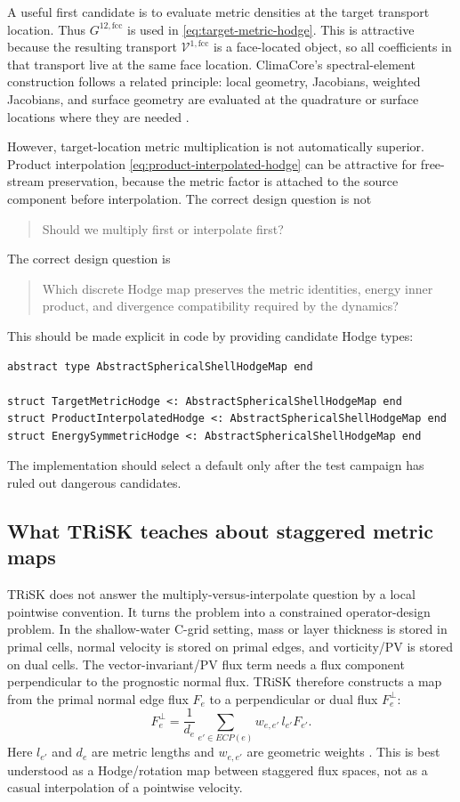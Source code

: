 \documentclass[11pt]{article}
\newcommand{\mc}[1]{\mathcal{#1}}
\newcommand{\Vflux}{\mc{V}}
\begin{document}
A useful first candidate is to evaluate metric densities at the target transport location.  Thus \(G^{12,\mathrm{fcc}}\) is used in \eqref{eq:target-metric-hodge}.  This is attractive because the resulting transport \(\Vflux^{1,\mathrm{fcc}}\) is a face-located object, so all coefficients in that transport live at the same face location.  ClimaCore's spectral-element construction follows a related principle: local geometry, Jacobians, weighted Jacobians, and surface geometry are evaluated at the quadrature or surface locations where they are needed \citep{ClimaCoreSpectralElement}.

However, target-location metric multiplication is not automatically superior.  Product interpolation \eqref{eq:product-interpolated-hodge} can be attractive for free-stream preservation, because the metric factor is attached to the source component before interpolation.  The correct design question is not
\begin{quote}
Should we multiply first or interpolate first?
\end{quote}
The correct design question is
\begin{quote}
Which discrete Hodge map preserves the metric identities, energy inner product, and divergence compatibility required by the dynamics?
\end{quote}

This should be made explicit in code by providing candidate Hodge types:
\begin{lstlisting}
abstract type AbstractSphericalShellHodgeMap end

struct TargetMetricHodge <: AbstractSphericalShellHodgeMap end
struct ProductInterpolatedHodge <: AbstractSphericalShellHodgeMap end
struct EnergySymmetricHodge <: AbstractSphericalShellHodgeMap end
\end{lstlisting}
The implementation should select a default only after the test campaign has ruled out dangerous candidates.

\subsection{What TRiSK teaches about staggered metric maps}
\label{subsec:trisk-lessons}

TRiSK does not answer the multiply-versus-interpolate question by a local pointwise convention.  It turns the problem into a constrained operator-design problem.  In the shallow-water C-grid setting, mass or layer thickness is stored in primal cells, normal velocity is stored on primal edges, and vorticity/PV is stored on dual cells.  The vector-invariant/PV flux term needs a flux component perpendicular to the prognostic normal flux.  TRiSK therefore constructs a map from the primal normal edge flux \(F_e\) to a perpendicular or dual flux \(F_e^\perp\):
\begin{equation}
  F_e^\perp
  =
  \frac{1}{d_e}
  \sum_{e'\in ECP(e)} w_{e,e'}\,l_{e'}F_{e'}.
  \label{eq:trisk-perp-flux}
\end{equation}
Here \(l_{e'}\) and \(d_e\) are metric lengths and \(w_{e,e'}\) are geometric weights \citep{Ringler2010}.  This is best understood as a Hodge/rotation map between staggered flux spaces, not as a casual interpolation of a pointwise velocity.
\end{document}
